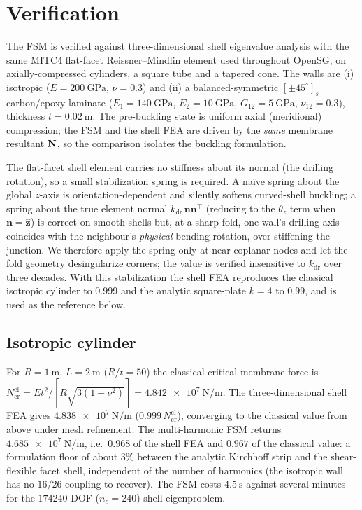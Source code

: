 \section{Verification}\label{sec:results}
The FSM is verified against three-dimensional shell eigenvalue analysis with the same MITC4 flat-facet
Reissner--Mindlin element used throughout OpenSG, on axially-compressed cylinders, a square tube and a
tapered cone. The walls are (i) isotropic ($E=\SI{200}{\giga\pascal}$, $\nu=0.3$) and (ii) a
balanced-symmetric $[\pm45^\circ]_s$ carbon/epoxy laminate ($E_1=\SI{140}{\giga\pascal}$,
$E_2=\SI{10}{\giga\pascal}$, $G_{12}=\SI{5}{\giga\pascal}$, $\nu_{12}=0.3$), thickness $t=\SI{0.02}{\metre}$.
The pre-buckling state is uniform axial (meridional) compression; the FSM and the shell FEA are driven by the
\emph{same} membrane resultant $\mathbf{N}$, so the comparison isolates the buckling formulation.

The flat-facet shell element carries no stiffness about its normal (the drilling rotation), so a small
stabilization spring is required. A na\"ive spring about the global $z$-axis is orientation-dependent and
silently softens curved-shell buckling; a spring about the true element normal
$k_{\mathrm{dr}}\,\mathbf n\mathbf n^{\!\top}$ (reducing to the $\theta_z$ term when $\mathbf n=\hat{\mathbf z}$)
is correct on smooth shells but, at a sharp fold, one wall's drilling axis coincides with the neighbour's
\emph{physical} bending rotation, over-stiffening the junction. We therefore apply the spring only at
near-coplanar nodes and let the fold geometry desingularize corners; the value is verified insensitive to
$k_{\mathrm{dr}}$ over three decades. With this stabilization the shell FEA reproduces the classical isotropic
cylinder to $0.999$ and the analytic square-plate $k{=}4$ to $0.99$, and is used as the reference below.

\subsection{Isotropic cylinder}
For $R=\SI{1}{\metre}$, $L=\SI{2}{\metre}$ ($R/t=50$) the classical critical membrane force is
$N_{\mathrm{cr}}^{\mathrm{cl}}=E t^2/[R\sqrt{3(1-\nu^2)}]=\SI{4.842e7}{\newton\per\metre}$. The
three-dimensional shell FEA gives $\SI{4.838e7}{\newton\per\metre}$ ($0.999\,N_{\mathrm{cr}}^{\mathrm{cl}}$),
converging to the classical value from above under mesh refinement. The multi-harmonic FSM returns
$\SI{4.685e7}{\newton\per\metre}$, i.e.\ $0.968$ of the shell FEA and $0.967$ of the classical value: a
formulation floor of about $3\%$ between the analytic Kirchhoff strip and the shear-flexible facet shell,
independent of the number of harmonics (the isotropic wall has no $16/26$ coupling to recover). The FSM
costs $\SI{4.5}{\second}$ against several minutes for the $\num{174240}$-DOF ($n_c=240$) shell eigenproblem.

